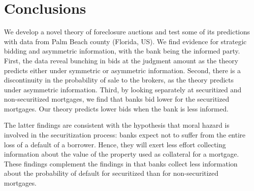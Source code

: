 \documentclass[11pt,twopage]{article}
\begin{document}
%
%
%
%
\section{Conclusions}

We develop a novel theory of foreclosure auctions and test some of its
predictions with data from Palm Beach county (Florida, US). We find
evidence for strategic bidding and asymmetric information, with the
bank being the informed party. First, the data reveal bunching in bids
at the judgment amount as the theory predicts either under symmetric
or asymmetric information. Second, there is a discontinuity in the
probability of sale to the brokers, as the theory predicts under
asymmetric information. Third, by looking separately at securitized
and non-securitized mortgages, we find that banks bid lower for the
securitized mortgages. Our theory predicts lower bids when the bank is
less informed.

The latter findings are consistent with the hypothesis that moral
hazard is involved in the securitization process: banks expect not to
suffer from the entire loss of a default of a borrower. Hence, they
will exert less effort collecting information about the value of the
property used as collateral for a mortgage. These findings complement
the findings in \cite{keys2008did} that banks collect less information
about the probability of default for securitized than for
non-securitized mortgages.
\end{document}
